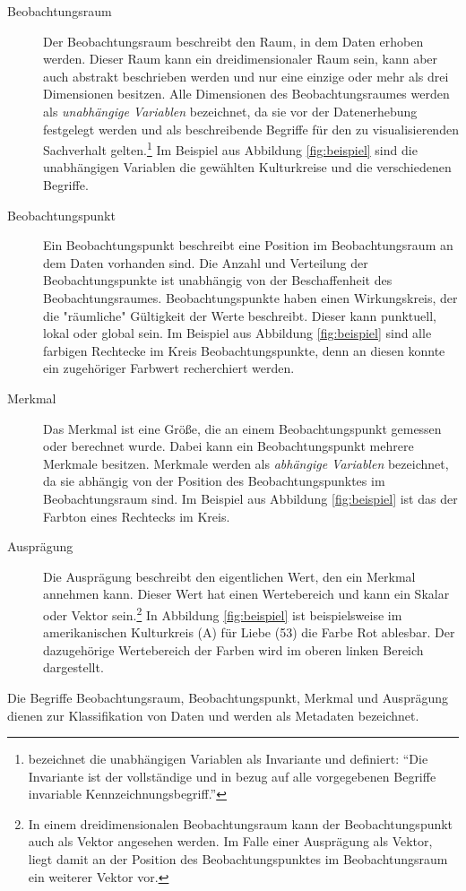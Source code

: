 \documentclass[a4paper, 12pt, DIV=calc, version=first, pdftex, headsepline, footsepline, bibtotocnumbered, liststotocnumbered]{scrreprt}
\begin{document}
\begin{description}
\item[Beobachtungsraum]
Der Beobachtungsraum beschreibt den Raum, in dem Daten erhoben werden. Dieser Raum kann ein
dreidimensionaler Raum sein, kann aber auch abstrakt beschrieben werden und nur eine einzige oder
mehr als drei Dimensionen besitzen. Alle Dimensionen des Beobachtungsraumes werden als \textit{unabhängige
Variablen} bezeichnet, da sie vor der Datenerhebung festgelegt werden und als beschreibende Begriffe für
den zu visualisierenden Sachverhalt gelten.\footnote{\citep[S.\,24]{Bertin} bezeichnet die unabhängigen
Variablen als Invariante und definiert: "`Die Invariante ist der vollständige und in bezug auf alle vorgegebenen
Begriffe invariable Kennzeichnungsbegriff."'} Im Beispiel aus Abbildung \ref{fig:beispiel} sind die
unabhängigen Variablen die gewählten Kulturkreise und die verschiedenen Begriffe.
\item[Beobachtungspunkt]
Ein Beobachtungspunkt beschreibt eine Position im Beobachtungsraum an dem Daten vorhanden sind. Die Anzahl und Verteilung
der Beobachtungspunkte ist unabhängig von der Beschaffenheit des Beobachtungsraumes. Beobachtungspunkte haben einen
Wirkungskreis, der die "räumliche" Gültigkeit der Werte beschreibt. Dieser kann punktuell, lokal oder global sein.
Im Beispiel aus Abbildung \ref{fig:beispiel} sind alle farbigen Rechtecke im Kreis Beobachtungspunkte, denn an
diesen konnte ein zugehöriger Farbwert recherchiert werden.
\item[Merkmal]
Das Merkmal ist eine Größe, die an einem Beobachtungspunkt gemessen oder berechnet wurde. Dabei kann
ein Beobachtungspunkt mehrere Merkmale besitzen. Merkmale werden als \textit{abhängige Variablen} bezeichnet, da
sie abhängig von der Position des Beobachtungspunktes im Beobachtungsraum sind.
Im Beispiel aus Abbildung \ref{fig:beispiel} ist das der Farbton eines Rechtecks im Kreis.
\item[Ausprägung]
Die Ausprägung beschreibt den eigentlichen Wert, den ein Merkmal annehmen kann. Dieser Wert hat einen
Wertebereich und kann ein Skalar oder Vektor sein.\footnote{In einem dreidimensionalen Beobachtungsraum
kann der Beobachtungspunkt auch als Vektor angesehen werden. Im Falle einer Ausprägung als Vektor, liegt damit
an der Position des Beobachtungspunktes im Beobachtungsraum ein weiterer Vektor vor.}
In Abbildung \ref{fig:beispiel} ist beispielsweise im amerikanischen Kulturkreis (A) für Liebe (53) die Farbe
Rot ablesbar. Der dazugehörige Wertebereich der Farben wird im oberen linken Bereich dargestellt.
\end{description}
Die Begriffe Beobachtungsraum, Beobachtungspunkt, Merkmal und Ausprägung dienen zur Klassifikation von Daten
und werden als Metadaten bezeichnet.
\end{document}
